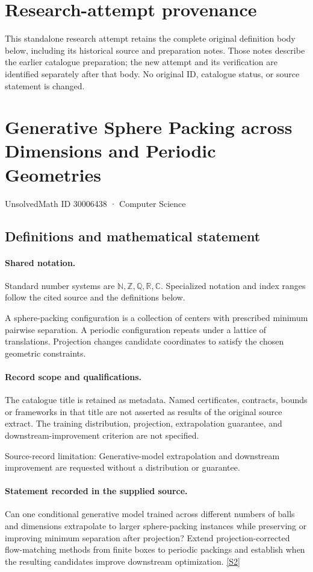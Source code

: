 \documentclass[11pt]{article}
\begin{document}
\section*{Research-attempt provenance}
This standalone research attempt retains the complete original definition body below,
including its historical source and preparation notes. Those notes describe the
earlier catalogue preparation; the new attempt and its verification are identified
separately after that body. No original ID, catalogue status, or source statement is changed.

\section{Generative Sphere Packing across Dimensions and Periodic Geometries}\label{30006438}
{\small UnsolvedMath ID 30006438 · Computer Science}
\subsection{Definitions and mathematical statement}

\paragraph{Shared notation.}Standard number systems are $\mathbb N,\mathbb Z,\mathbb Q,\mathbb R,\mathbb C$. Specialized notation and index ranges follow the cited source and the definitions below.


A sphere-packing configuration is a collection of centers with prescribed minimum pairwise separation. A periodic configuration repeats under a lattice of translations. Projection changes candidate coordinates to satisfy the chosen geometric constraints.
\paragraph{Record scope and qualifications.}
The catalogue title is retained as metadata. Named certificates, contracts, bounds or frameworks in that title are not asserted as results of the original source extract.
The training distribution, projection, extrapolation guarantee, and downstream-improvement criterion are not specified.

Source-record limitation: Generative-model extrapolation and downstream improvement are requested without a distribution or guarantee.
\paragraph{Statement recorded in the supplied source.}
Can one conditional generative model trained across different numbers of balls and dimensions extrapolate to larger sphere-packing instances while preserving or improving minimum separation after projection? Extend projection-corrected flow-matching methods from finite boxes to periodic packings and establish when the resulting candidates improve downstream optimization. \href{https://doi.org/10.4171/owr/2025/43}{[S2]}
\end{document}
